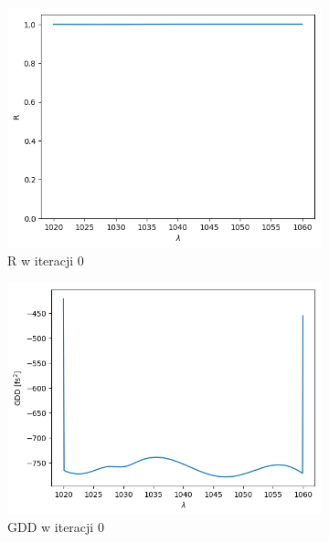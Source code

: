 \begin{figure} [H]
    \centering
    \begin{subfigure}[b]{0.30\textwidth}
        \includegraphics[width=\linewidth]{figures/wyniki/losowe/dbr_opt/result_Rresult0.png}
        \caption{R w iteracji 0}
    \end{subfigure}
            \begin{subfigure}[b]{0.31\textwidth}
        \includegraphics[width=\linewidth]{figures/wyniki/losowe/dbr_opt/result_gddresult0.png}
        \caption{GDD w iteracji 0}
    \end{subfigure}
            \begin{subfigure}[b]{0.32\textwidth}

\end{subfigure}
\end{figure}
